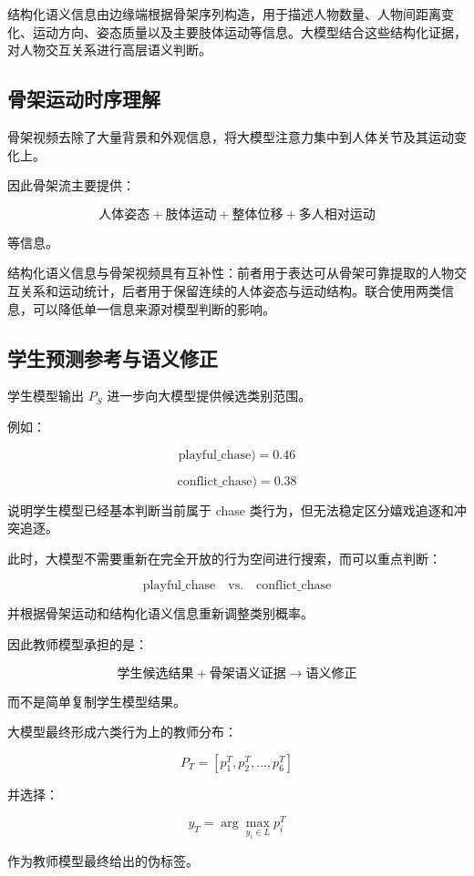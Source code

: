 结构化语义信息由边缘端根据骨架序列构造，用于描述人物数量、人物间距离变化、运动方向、姿态质量以及主要肢体运动等信息。大模型结合这些结构化证据，对人物交互关系进行高层语义判断。

\subsection{骨架运动时序理解}

骨架视频去除了大量背景和外观信息，将大模型注意力集中到人体关节及其运动变化上。

因此骨架流主要提供：

\[
\text{人体姿态}
+
\text{肢体运动}
+
\text{整体位移}
+
\text{多人相对运动}
\]

等信息。

结构化语义信息与骨架视频具有互补性：前者用于表达可从骨架可靠提取的人物交互关系和运动统计，后者用于保留连续的人体姿态与运动结构。联合使用两类信息，可以降低单一信息来源对模型判断的影响。

\subsection{学生预测参考与语义修正}

学生模型输出 \(P_S\) 进一步向大模型提供候选类别范围。

例如：

\[
\text{playful\_chase})=0.46
\]

\[
\text{conflict\_chase})=0.38
\]

说明学生模型已经基本判断当前属于 chase 类行为，但无法稳定区分嬉戏追逐和冲突追逐。

此时，大模型不需要重新在完全开放的行为空间进行搜索，而可以重点判断：

\[
\text{playful\_chase}
\quad\text{vs.}\quad
\text{conflict\_chase}
\]

并根据骨架运动和结构化语义信息重新调整类别概率。

因此教师模型承担的是：

\[
\boxed{
\text{学生候选结果}
+
\text{骨架语义证据}
\rightarrow
\text{语义修正}
}
\]

而不是简单复制学生模型结果。

大模型最终形成六类行为上的教师分布：

\[
P_T=
\left[
p_1^T,
p_2^T,\ldots,p_6^T
\right]
\]

并选择：

\[
y_T=
\arg\max_{y_i\in L}p_i^T
\]

作为教师模型最终给出的伪标签。

